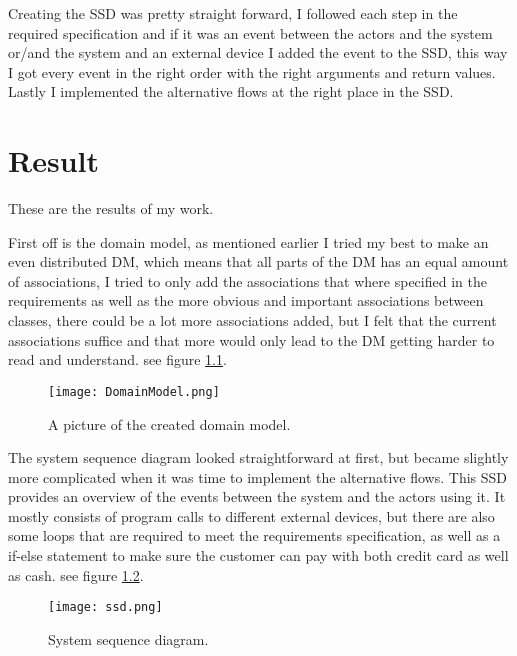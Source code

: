 \documentclass[a4paper]{scrreprt}
\begin{document}
Creating the SSD was pretty straight forward, I followed each step in the required specification and if it was an event between the actors and the system or/and the system and an external device I added the event to the SSD, this way I got every event in the right order with the right arguments and return values. Lastly I implemented the alternative flows at the right place in the SSD.



\chapter{Result}
\label{sec:result}

These are the results of my work.

First off is the domain model, as mentioned earlier I tried my best to make an even distributed DM, which means that all parts of the DM has an equal amount of associations, I tried to only add the associations that where specified in the requirements as well as the more obvious and important associations between classes, there could be a lot more associations added, but I felt that the current associations suffice and that more would only lead to the DM getting harder to read and understand. see figure \ref{fig:dmodel}.

\begin{figure}[h]
  \begin{center}
    \texttt{[image: DomainModel.png]}
    \caption{A picture of the created domain model.}
    \label{fig:dmodel}
  \end{center}
\end{figure}

\noindent The system sequence diagram looked straightforward at first, but became slightly more complicated when it was time to implement the alternative flows. This SSD provides an overview of the events between the system and the actors using it. It mostly consists of program calls to different external devices, but there are also some loops that are required to meet the requirements specification, as well as a if-else statement to make sure the customer can pay with both credit card as well as cash. see figure \ref{fig:ssd}.

\begin{figure}[h]
  \begin{center}
    \texttt{[image: ssd.png]}
    \caption{System sequence diagram.}
    \label{fig:ssd}
  \end{center}
\end{figure}
\end{document}

